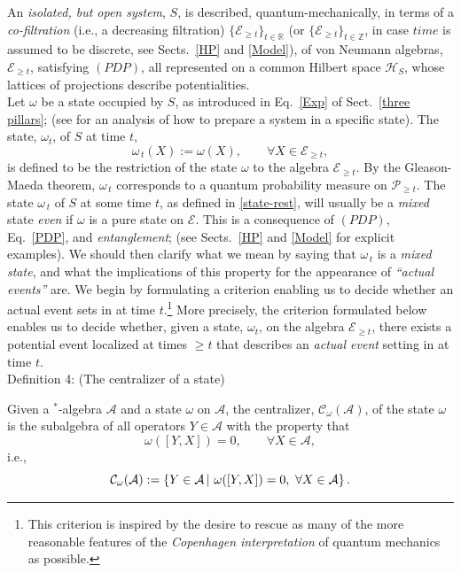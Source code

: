 \documentclass[12pt]{article}
\begin{document}
An \textit{isolated, but open system}, $S$, is described, quantum-mechanically, in terms of a \textit{co-filtration} (i.e., a decreasing filtration)
$\lbrace \mathcal{E}_{\geq t} \rbrace_{t \in \mathbb{R}}$ (or $\lbrace \mathcal{E}_{\geq t} \rbrace_{t \in \mathbb{Z}}$, in case $time$ is assumed to be discrete, see Sects.~\ref{HP} and \ref{Model}), of von
Neumann algebras, $\mathcal{E}_{\geq t}$, satisfying $(PDP)$, all represented on a common Hilbert space $\mathcal{H}_S$,
whose lattices of projections describe potentialities. \\

Let $\omega$ be a state occupied by $S$, as introduced in Eq.~\eqref{Exp} of Sect.~\ref{three pillars}; (see \cite{Fr-Schub} for an analysis of how to prepare a system in a specific state). The state,
$\omega_t$, of $S$ at time $t$,
\begin{equation}\label{state-rest}
\omega_{\,t}(X):= \omega(X), \qquad \forall X \in \mathcal{E}_{\geq t},
\end{equation}
is defined to be the restriction of the state $\omega$ to the algebra $\mathcal{E}_{\geq t}$. By the Gleason-Maeda theorem,
$\omega_{\,t}$
corresponds to a quantum probability measure on $\mathcal{P}_{\geq t}$. The state $\omega_{\,t}$ of $S$
at some time $t$, as defined in \eqref{state-rest}, will usually be a \textit{mixed} state  \textit{even} if $\omega$
is a pure state on $\mathcal{E}$. This is a consequence of $(PDP)$, Eq.~\eqref{PDP}, and \textit{entanglement}; (see Sects.~\ref{HP} and \ref{Model} for explicit examples). We should then clarify what we mean by saying that
$\omega_{\,t}$ is a \textit{mixed state}, and what the implications of this property for the appearance
of \textit{``actual events''} are.
We begin by formulating a criterion enabling us to decide whether an actual event sets in at time
$t$.\footnote{This criterion is inspired by the desire to rescue as many of the more reasonable features of the \textit{Copenhagen interpretation} of quantum mechanics as possible.} More precisely, the criterion formulated below
enables us to decide whether, given a state, $\omega_t$, on the algebra $\mathcal{E}_{\geq t}$, there exists a potential
event localized at times $\geq t$ that describes an \textit{actual event} setting in at time $t$.\\

{Definition 4}: (The centralizer of a state) \label{defcentralizer}

Given a $^{*}$-algebra $\mathcal{A}$ and a state $\omega$ on $\mathcal{A}$, the centralizer,
$\mathcal{C}_{\omega}(\mathcal{A})$, of the state $\omega$ is the subalgebra of all operators $Y \in \mathcal{A}$
with the property that
$$\omega([Y, X]) =0, \qquad \forall X \in \mathcal{A},$$
i.e.,
$$\hspace{2.8cm}\mathcal{C}_{\omega}(\mathcal{A}):=\left\{Y\in \mathcal{A}\, \vert \,\,\omega([Y, X]) =0, \,\,\forall X \in \mathcal{A}\right\} .
\hspace{2.8cm} \square$$
\end{document}

